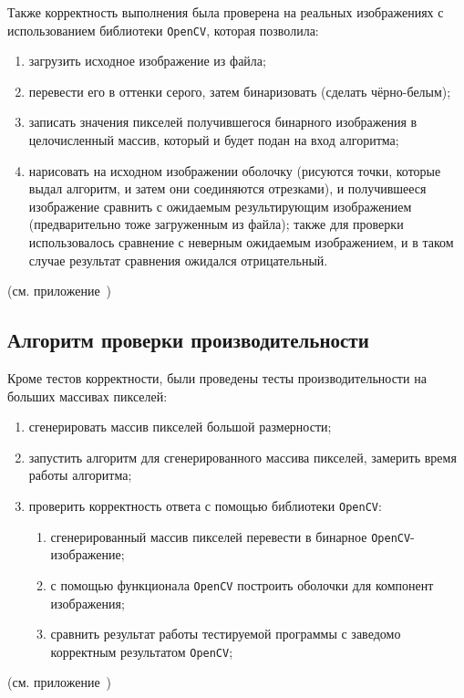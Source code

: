 \documentclass[12pt]{article}
\begin{document}
Также корректность выполнения была проверена на реальных изображениях с использованием библиотеки \texttt{OpenCV}, которая позволила:
\begin{enumerate}
    \item загрузить исходное изображение из файла;
    \item перевести его в оттенки серого, затем бинаризовать (сделать чёрно-белым);
    \item записать значения пикселей получившегося бинарного изображения в целочисленный массив, который и будет подан на вход алгоритма;
    \item нарисовать на исходном изображении оболочку (рисуются точки, которые выдал алгоритм, и затем они соединяются отрезками), и получившееся изображение сравнить с ожидаемым результирующим изображением (предварительно тоже загруженным из файла); также для проверки использовалось сравнение с неверным ожидаемым изображением, и в таком случае результат сравнения ожидался отрицательный.
\end{enumerate}
(см. приложение~)

\subsection{Алгоритм проверки производительности}
Кроме тестов корректности, были проведены тесты производительности на больших массивах пикселей:
\begin{enumerate}
    \item сгенерировать массив пикселей большой размерности;
    \item запустить алгоритм для сгенерированного массива пикселей, замерить время работы алгоритма;
    \item проверить корректность ответа с помощью библиотеки \texttt{OpenCV}:
    \begin{enumerate}
        \item сгенерированный массив пикселей перевести в бинарное \texttt{OpenCV}-изображение;
        \item с помощью функционала \texttt{OpenCV} построить оболочки для компонент изображения;
        \item сравнить результат работы тестируемой программы с заведомо корректным результатом \texttt{OpenCV};
    \end{enumerate}
\end{enumerate}
(см. приложение~)
\end{document}
